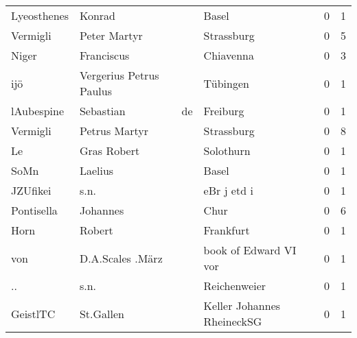 \begin{tabular}{llllrr}
              Lyeosthenes &                             Konrad &             &                                       Basel &          0 &         1 \\
                 Vermigli &                       Peter Martyr &             &                                  Strassburg &          0 &         5 \\
                    Niger &                         Franciscus &             &                                   Chiavenna &          0 &         3 \\
                      ijö &            Vergerius Petrus Paulus &             &                                    Tübingen &          0 &         1 \\
               lAubespine &                          Sebastian &          de &                                    Freiburg &          0 &         1 \\
                 Vermigli &                      Petrus Martyr &             &                                  Strassburg &          0 &         8 \\
                       Le &                        Gras Robert &             &                                   Solothurn &          0 &         1 \\
                     SoMn &                            Laelius &             &                                       Basel &          0 &         1 \\
                 JZUfikei &                               s.n. &             &                                 eBr j etd i &          0 &         1 \\
               Pontisella &                           Johannes &             &                                        Chur &          0 &         6 \\
                     Horn &                             Robert &             &                                   Frankfurt &          0 &         1 \\
                      von &                   D.A.Scales .März &             &                       book of Edward VI vor &          0 &         1 \\
                       .. &                               s.n. &             &                                Reichenweier &          0 &         1 \\
                 GeistlTC &                          St.Gallen &             &                  Keller Johannes RheineckSG &          0 &         1 \\

\end{tabular}
